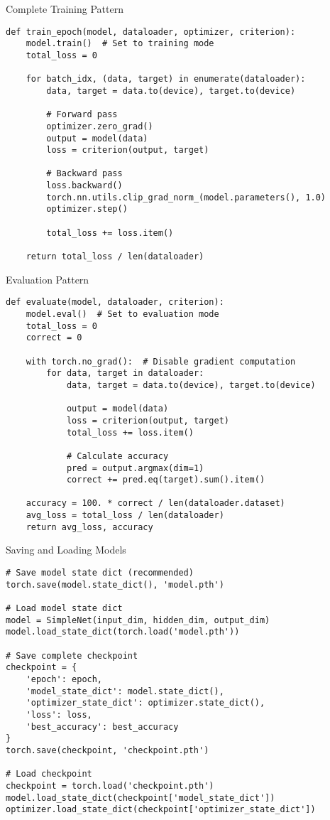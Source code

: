 \documentclass[aspectratio=169,10pt]{beamer}
\begin{document}
\begin{frame}[fragile]{Complete Training Pattern}
\begin{lstlisting}
def train_epoch(model, dataloader, optimizer, criterion):
    model.train()  # Set to training mode
    total_loss = 0
    
    for batch_idx, (data, target) in enumerate(dataloader):
        data, target = data.to(device), target.to(device)
        
        # Forward pass
        optimizer.zero_grad()
        output = model(data)
        loss = criterion(output, target)
        
        # Backward pass
        loss.backward()
        torch.nn.utils.clip_grad_norm_(model.parameters(), 1.0)
        optimizer.step()
        
        total_loss += loss.item()
    
    return total_loss / len(dataloader)
\end{lstlisting}
\end{frame}

\begin{frame}[fragile]{Evaluation Pattern}
\begin{lstlisting}
def evaluate(model, dataloader, criterion):
    model.eval()  # Set to evaluation mode
    total_loss = 0
    correct = 0
    
    with torch.no_grad():  # Disable gradient computation
        for data, target in dataloader:
            data, target = data.to(device), target.to(device)
            
            output = model(data)
            loss = criterion(output, target)
            total_loss += loss.item()
            
            # Calculate accuracy
            pred = output.argmax(dim=1)
            correct += pred.eq(target).sum().item()
    
    accuracy = 100. * correct / len(dataloader.dataset)
    avg_loss = total_loss / len(dataloader)
    return avg_loss, accuracy
\end{lstlisting}
\end{frame}

\begin{frame}[fragile]{Saving and Loading Models}
\begin{lstlisting}
# Save model state dict (recommended)
torch.save(model.state_dict(), 'model.pth')

# Load model state dict
model = SimpleNet(input_dim, hidden_dim, output_dim)
model.load_state_dict(torch.load('model.pth'))

# Save complete checkpoint
checkpoint = {
    'epoch': epoch,
    'model_state_dict': model.state_dict(),
    'optimizer_state_dict': optimizer.state_dict(),
    'loss': loss,
    'best_accuracy': best_accuracy
}
torch.save(checkpoint, 'checkpoint.pth')

# Load checkpoint
checkpoint = torch.load('checkpoint.pth')
model.load_state_dict(checkpoint['model_state_dict'])
optimizer.load_state_dict(checkpoint['optimizer_state_dict'])
\end{lstlisting}
\end{frame}
\end{document}
